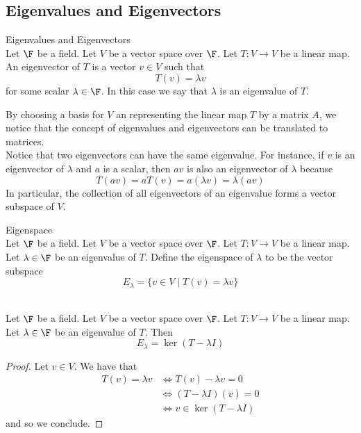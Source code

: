 \documentclass[a4paper]{article}
\begin{document}
\subsection{Eigenvalues and Eigenvectors}
\begin{defn}{Eigenvalues and Eigenvectors}{}\\
Let $\F$ be a field. Let $V$ be a vector space over $\F$. Let $T:V\to V$ be a linear map. An eigenvector of $T$ is a vector $v\in V$ such that $$T(v)=\lambda v$$ for some scalar $\lambda\in\F$. In this case we say that $\lambda$ is an eigenvalue of $T$. 
\end{defn}

By choosing a basis for $V$ an representing the linear map $T$ by a matrix $A$, we notice that the concept of eigenvalues and eigenvectors can be translated to matrices. \\

Notice that two eigenvectors can have the same eigenvalue. For instance, if $v$ is an eigenvector of $\lambda$ and $a$ is a scalar, then $av$ is also an eigenvector of $\lambda$ because $$T(av)=aT(v)=a(\lambda v)=\lambda(av)$$ In particular, the collection of all eigenvectors of an eigenvalue forms a vector subspace of $V$. 

\begin{defn}{Eigenspace}{}\\
Let $\F$ be a field. Let $V$ be a vector space over $\F$. Let $T:V\to V$ be a linear map. Let $\lambda\in\F$ be an eigenvalue of $T$. Define the eigenspace of $\lambda$ to be the vector subspace $$E_\lambda=\{v\in V\;|\;T(v)=\lambda v\}$$
\end{defn}

\begin{lmm}{}{}\\
Let $\F$ be a field. Let $V$ be a vector space over $\F$. Let $T:V\to V$ be a linear map. Let $\lambda\in\F$ be an eigenvalue of $T$. Then $$E_\lambda=\ker(T-\lambda I)$$ 
\begin{proof}
Let $v\in V$. We have that 
\begin{align*}
T(v)=\lambda v&\iff T(v)-\lambda v=0\\
&\iff (T-\lambda I)(v)=0\\
&\iff v\in\ker(T-\lambda I)
\end{align*}
and so we conclude. 
\end{proof}
\end{lmm}
\end{document}
